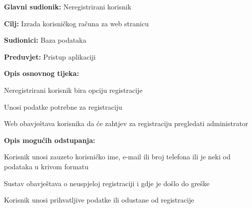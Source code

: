					\begin{packed_item}

						\item  \textbf{Glavni sudionik: } Neregistrirani korisnik
						\item  \textbf{Cilj:} Izrada korisničkog računa za web stranicu
						\item  \textbf{Sudionici:} Baza podataka
						\item  \textbf{Preduvjet:} Pristup aplikaciji
						\item  \textbf{Opis osnovnog tijeka:}
						
						\item[] \begin{packed_enum}
	
							\item Neregistrirani korisnik bira opciju registracije
                           					\item Unosi podatke potrebne za registraciju
							\item Web obavještava korisnika da će zahtjev za registraciju pregledati administrator
						\end{packed_enum}
						
						\item  \textbf{Opis mogućih odstupanja:}
						
						\item[] \begin{packed_item}
	
							\item[2.a] Korisnik unosi zauzeto korisničko ime, e-mail ili broj telefona ili je neki od podataka u krivom formatu
							\item[] \begin{packed_enum}
								
								\item Sustav obavještava o neuspjeloj registraciji i gdje je došlo do greške
								\item Korisnik unosi prihvatljive podatke ili odustane od registracije
								
							\end{packed_enum}
						\end{packed_item}
					\end{packed_item}

